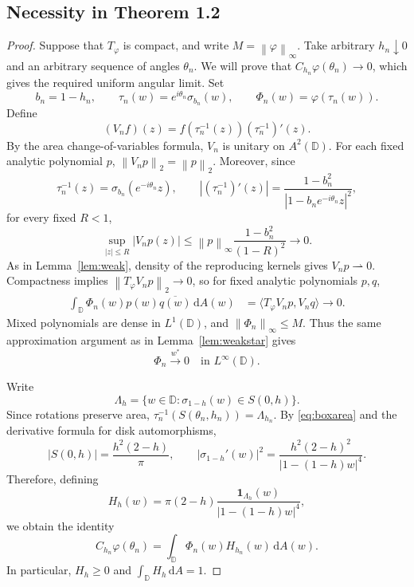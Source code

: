 \documentclass[12pt,a4paper]{article}
\theoremstyle{remark}
\newcommand{\D}{\mathbb D}
\newcommand{\dA}{\,\mathrm dA}
\newcommand{\A}{A^2(\D)}
\newcommand{\norm}[1]{\left\lVert#1\right\rVert}
\begin{document}
\subsection{Necessity in Theorem 1.2}
\begin{proof}
Suppose that $T_\varphi$ is compact, and write $M=\norm\varphi_\infty$.
Take arbitrary $h_n\downarrow0$ and an arbitrary sequence of angles $\theta_n$. We will prove that
$C_{h_n}\varphi(\theta_n)\to0$, which gives the required uniform angular limit.
Set
\[
b_n=1-h_n,\qquad
\tau_n(w)=e^{i\theta_n}\sigma_{b_n}(w),\qquad
\Phi_n(w)=\varphi(\tau_n(w)).
\]
Define
\[
(V_nf)(z)=f(\tau_n^{-1}(z))(\tau_n^{-1})'(z).
\]
By the area change-of-variables formula, $V_n$ is unitary on $\A$. For each fixed analytic polynomial $p$,
$\norm{V_np}_2=\norm p_2$. Moreover, since
\[
\tau_n^{-1}(z)=\sigma_{b_n}(e^{-i\theta_n}z),
\qquad
|(\tau_n^{-1})'(z)|=\frac{1-b_n^2}{|1-b_ne^{-i\theta_n}z|^2},
\]
for every fixed $R<1$,
\[
\sup_{|z|\le R}|V_np(z)|
\le\norm p_\infty\frac{1-b_n^2}{(1-R)^2}\longrightarrow0.
\]
As in Lemma~\ref{lem:weak}, density of the reproducing kernels gives $V_np\rightharpoonup0$.
Compactness implies $\norm{T_\varphi V_np}_2\to0$, so for fixed analytic polynomials $p,q$,
\begin{align*}
\int_\D\Phi_n(w)p(w)\overline{q(w)}\dA(w)
&=\langle T_\varphi V_np,V_nq\rangle\longrightarrow0.
\end{align*}
Mixed polynomials are dense in $L^1(\D)$, and $\norm{\Phi_n}_\infty\le M$.
Thus the same approximation argument as in Lemma~\ref{lem:weakstar} gives
\begin{equation}\label{eq:boxnecess-weakstar}
\Phi_n\overset{w^*}{\longrightarrow}0\quad\text{in }L^\infty(\D).
\end{equation}

Write
\[
\Lambda_h=\{w\in\D:\sigma_{1-h}(w)\in S(0,h)\}.
\]
Since rotations preserve area, $\tau_n^{-1}(S(\theta_n,h_n))=\Lambda_{h_n}$.
By \eqref{eq:boxarea} and the derivative formula for disk automorphisms,
\[
|S(0,h)|=\frac{h^2(2-h)}\pi,
\qquad
|\sigma_{1-h}'(w)|^2=
\frac{h^2(2-h)^2}{|1-(1-h)w|^4}.
\]
Therefore, defining
\begin{equation}\label{eq:boxnecess-weight}
H_h(w)=\pi(2-h)\frac{\mathbf1_{\Lambda_h}(w)}{|1-(1-h)w|^4},
\end{equation}
we obtain the identity
\begin{equation}\label{eq:boxnecess-pairing}
C_{h_n}\varphi(\theta_n)=\int_\D\Phi_n(w)H_{h_n}(w)\dA(w).
\end{equation}
In particular, $H_h\ge0$ and $\int_\D H_h\dA=1$.


\end{proof}
\end{document}
